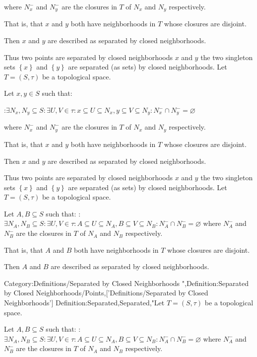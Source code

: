 where $N_x^-$ and $N_y^-$ are the closures in $T$ of $N_x$ and $N_y$ respectively.


That is, that $x$ and $y$ both have neighborhoods in $T$ whose closures are disjoint.


Then $x$ and $y$ are described as separated by closed neighborhoods.


Thus two points are separated by closed neighborhoods $x$ and $y$  the two singleton sets $\left\lbrace x \right\rbrace$ and $\left\lbrace y \right\rbrace$ are separated (as sets) by closed neighborhoods.
Let $T = \left( S, \tau \right)$ be a topological space.


Let $x, y \in S$ such that:

:$\exists N_x, N_y \subseteq S: \exists U, V \in \tau: x \subseteq U \subseteq N_x, y \subseteq V \subseteq N_y: N_x^- \cap N_y^- = \varnothing$

where $N_x^-$ and $N_y^-$ are the closures in $T$ of $N_x$ and $N_y$ respectively.


That is, that $x$ and $y$ both have neighborhoods in $T$ whose closures are disjoint.


Then $x$ and $y$ are described as separated by closed neighborhoods.


Thus two points are separated by closed neighborhoods $x$ and $y$  the two singleton sets $\left\lbrace x \right\rbrace$ and $\left\lbrace y \right\rbrace$ are separated (as sets) by closed neighborhoods.
Let $T = \left( S, \tau \right)$ be a topological space.


Let $A, B \subseteq S$ such that:
:$\exists N_A, N_B \subseteq S: \exists U, V \in \tau: A \subseteq U \subseteq N_A, B \subseteq V \subseteq N_B: N_A^- \cap N_B^- = \varnothing$
where $N_A^-$ and $N_B^-$ are the closures in $T$ of $N_A$ and $N_B$ respectively.

That is, that $A$ and $B$ both have neighborhoods in $T$ whose closures are disjoint.


Then $A$ and $B$ are described as separated by closed neighborhoods.


Category:Definitions/Separated by Closed Neighborhoods
",Definition:Separated by Closed Neighborhoods/Points,['Definitions/Separated by Closed Neighborhoods']
Definition:Separated,Separated,"Let $T = \left( S, \tau \right)$ be a topological space.


Let $A, B \subseteq S$ such that:
:$\exists N_A, N_B \subseteq S: \exists U, V \in \tau: A \subseteq U \subseteq N_A, B \subseteq V \subseteq N_B: N_A^- \cap N_B^- = \varnothing$
where $N_A^-$ and $N_B^-$ are the closures in $T$ of $N_A$ and $N_B$ respectively.

